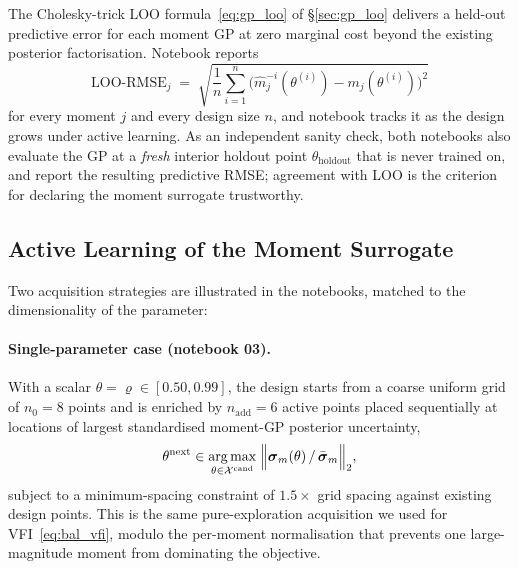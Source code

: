\documentclass[11pt,a4paper]{report}
\DeclareMathOperator*{\argmax}{arg\,max}
\begin{document}
The Cholesky-trick LOO formula~\eqref{eq:gp_loo} of \S\ref{sec:gp_loo} delivers a held-out predictive error for each moment GP at zero marginal cost beyond the existing posterior factorisation.  Notebook  reports
\[
\mathrm{LOO\text{-}RMSE}_j \;=\; \sqrt{\frac{1}{n}\sum_{i=1}^{n}\bigl(\widehat m_j^{-i}(\theta^{(i)}) - m_j(\theta^{(i)})\bigr)^2}
\]
for every moment $j$ and every design size $n$, and notebook  tracks it as the design grows under active learning.  As an independent sanity check, both notebooks also evaluate the GP at a \emph{fresh} interior holdout point $\theta_\mathrm{holdout}$ that is never trained on, and report the resulting predictive RMSE; agreement with LOO is the criterion for declaring the moment surrogate trustworthy.

\subsection{Active Learning of the Moment Surrogate}

Two acquisition strategies are illustrated in the notebooks, matched to the dimensionality of the parameter:

\paragraph{Single-parameter case (notebook 03).}  With a scalar $\theta=\varrho\in[0.50,0.99]$, the design starts from a coarse uniform grid of $n_0=8$ points and is enriched by $n_\mathrm{add}=6$ active points placed sequentially at locations of largest standardised moment-GP posterior uncertainty,
\[
\theta^{\mathrm{next}} \in \argmax_{\theta \in \mathcal{X}^\mathrm{cand}}\;\Bigl\|\boldsymbol\sigma_m(\theta) \,/\, \bar{\boldsymbol\sigma}_m\Bigr\|_2,
\]
subject to a minimum-spacing constraint of $1.5\times$ grid spacing against existing design points.  This is the same pure-exploration acquisition we used for VFI~\eqref{eq:bal_vfi}, modulo the per-moment normalisation that prevents one large-magnitude moment from dominating the objective.
\end{document}
